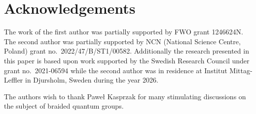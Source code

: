 \documentclass[12pt,reqno,a4paper]{amsart}
\theoremstyle{definition}
\numberwithin{equation}{section}
\begin{document}
\section{Acknowledgements}

The work of the first author was partially supported by FWO grant 1246624N. The second author was partially supported by NCN (National Science Centre, Poland) grant no.~2022/47/B/ST1/00582. Additionally the research presented in this paper is based upon work supported by the Swedish Research Council under grant no.~2021-06594 while the second author was in residence at Institut Mittag-Leffler in Djursholm, Sweden during the year 2026.

The authors wish to thank Pawe{\l} Kasprzak for many stimulating discussions on the subject of braided quantum groups.
\end{document}
